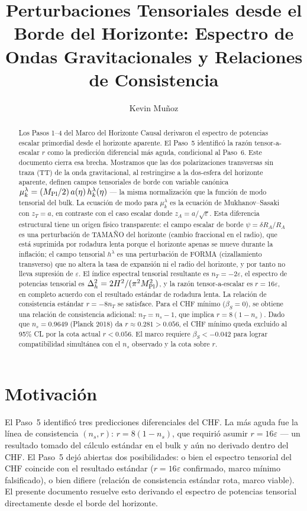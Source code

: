 \documentclass[12pt,a4paper]{article}
\title{Perturbaciones Tensoriales desde el Borde del Horizonte: Espectro de Ondas Gravitacionales y Relaciones de Consistencia}
\author{Kevin Mu\~noz}
\date{}
\begin{document}
\maketitle

\begin{abstract}
Los Pasos 1--4 del Marco del Horizonte Causal derivaron el espectro de potencias escalar primordial desde el horizonte aparente. El Paso~5 identificó la razón tensor-a-escalar $r$ como la predicción diferencial más aguda, condicional al Paso~6. Este documento cierra esa brecha. Mostramos que las dos polarizaciones transversas sin traza (TT) de la onda gravitacional, al restringirse a la dos-esfera del horizonte aparente, definen campos tensoriales de borde con variable canónica $\mu_k^\lambda = (M_{\rm Pl}/2)\,a(\eta)\,h_k^\lambda(\eta)$ --- la misma normalización que la función de modo tensorial del bulk. La ecuación de modo para $\mu_k^\lambda$ es la ecuación de Mukhanov--Sasaki con $z_T = a$, en contraste con el caso escalar donde $z_A = a/\sqrt\varepsilon$. Esta diferencia estructural tiene un origen físico transparente: el campo escalar de borde $\psi = \delta R_A/R_A$ es una perturbación de TAMAÑO del horizonte (cambio fraccional en el radio), que está suprimida por rodadura lenta porque el horizonte apenas se mueve durante la inflación; el campo tensorial $h^\lambda$ es una perturbación de FORMA (cizallamiento transverso) que no altera la tasa de expansión ni el radio del horizonte, y por tanto no lleva supresión de $\varepsilon$. El índice espectral tensorial resultante es $n_T = -2\varepsilon$, el espectro de potencias tensorial es $\Delta_h^2 = 2H^2/(\pi^2 M_{\rm Pl}^2)$, y la razón tensor-a-escalar es $r = 16\varepsilon$, en completo acuerdo con el resultado estándar de rodadura lenta. La relación de consistencia estándar $r = -8n_T$ se satisface. Para el CHF mínimo ($\beta_S = 0$), se obtiene una relación de consistencia adicional: $n_T = n_s - 1$, que implica $r = 8(1-n_s)$. Dado que $n_s = 0.9649$ (Planck 2018) da $r \approx 0.281 > 0.056$, el CHF mínimo queda excluido al 95\% CL por la cota actual $r < 0.056$. El marco requiere $\beta_S < -0.042$ para lograr compatibilidad simultánea con el $n_s$ observado y la cota sobre $r$.
\end{abstract}

\section{Motivación}

El Paso~5 identificó tres predicciones diferenciales del CHF. La más aguda fue la línea de consistencia $(n_s, r)$: $r = 8(1-n_s)$, que requirió asumir $r = 16\varepsilon$ --- un resultado tomado del cálculo estándar en el bulk y aún no derivado dentro del CHF. El Paso~5 dejó abiertas dos posibilidades: o bien el espectro tensorial del CHF coincide con el resultado estándar ($r = 16\varepsilon$ confirmado, marco mínimo falsificado), o bien difiere (relación de consistencia estándar rota, marco viable). El presente documento resuelve esto derivando el espectro de potencias tensorial directamente desde el borde del horizonte.
\end{document}
